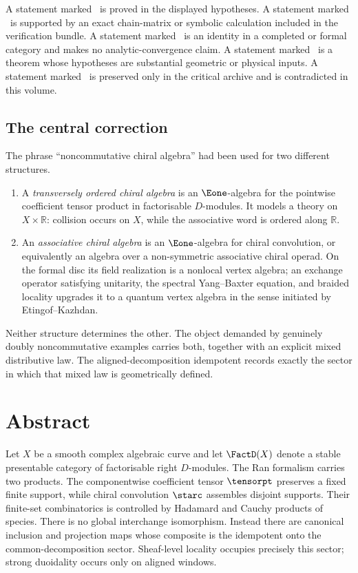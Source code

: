 \begin{statusbox}[title={Claim-status convention}]
A statement marked \proved\ is proved in the displayed hypotheses.  A statement marked \computed\ is supported by an exact chain-matrix or symbolic calculation included in the verification bundle.  A statement marked \formalstatus\ is an identity in a completed or formal category and makes no analytic-convergence claim.  A statement marked \conditional\ is a theorem whose hypotheses are substantial geometric or physical inputs.  A statement marked \retracted\ is preserved only in the critical archive and is contradicted in this volume.
\end{statusbox}

\section*{The central correction}
The phrase ``noncommutative chiral algebra'' had been used for two different structures.
\begin{enumerate}
\item A \emph{transversely ordered chiral algebra} is an \(\Eone\)-algebra for the pointwise coefficient tensor product in factorisable \(D\)-modules.  It models a theory on \(X\times\mathbb R\): collision occurs on \(X\), while the associative word is ordered along \(\mathbb R\).
\item An \emph{associative chiral algebra} is an \(\Eone\)-algebra for chiral convolution, or equivalently an algebra over a non-symmetric associative chiral operad.  On the formal disc its field realization is a nonlocal vertex algebra; an exchange operator satisfying unitarity, the spectral Yang--Baxter equation, and braided locality upgrades it to a quantum vertex algebra in the sense initiated by Etingof--Kazhdan.
\end{enumerate}
Neither structure determines the other.  The object demanded by genuinely doubly noncommutative examples carries both, together with an explicit mixed distributive law.  The aligned-decomposition idempotent records exactly the sector in which that mixed law is geometrically defined.

\chapter*{Abstract}
Let \(X\) be a smooth complex algebraic curve and let \(\FactD(X)\) denote a stable presentable category of factorisable right \(D\)-modules.  The Ran formalism carries two products.  The componentwise coefficient tensor \(\tensorpt\) preserves a fixed finite support, while chiral convolution \(\starc\) assembles disjoint supports.  Their finite-set combinatorics is controlled by Hadamard and Cauchy products of species.  There is no global interchange isomorphism.  Instead there are canonical inclusion and projection maps whose composite is the idempotent onto the common-decomposition sector.  Sheaf-level locality occupies precisely this sector; strong duoidality occurs only on aligned windows.

